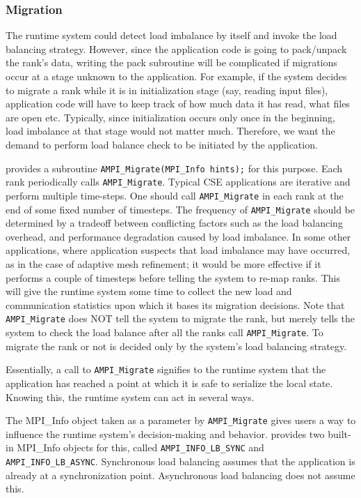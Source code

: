 \documentclass[10pt]{article}
\begin{document}
\subsubsection{Migration}

The \ampi{} runtime system could detect load imbalance by itself and invoke the
load balancing strategy. However, since the application code is going to
pack/unpack the rank's data, writing the pack subroutine will be complicated
if migrations occur at a stage unknown to the application. For example, if the
system decides to migrate a rank while it is in initialization stage (say,
reading input files), application code will have to keep track of how much data
it has read, what files are open etc. Typically, since initialization occurs
only once in the beginning, load imbalance at that stage would not matter much.
Therefore, we want the demand to perform load balance check to be initiated by
the application.

\ampi{} provides a subroutine \texttt{AMPI\_Migrate(MPI\_Info hints);} for
this purpose. Each rank periodically calls \texttt{AMPI\_Migrate}. Typical
CSE applications are iterative and perform multiple time-steps. One should call
\texttt{AMPI\_Migrate} in each rank at the end of some fixed number of
timesteps. The frequency of \texttt{AMPI\_Migrate} should be determined by a
tradeoff between conflicting factors such as the load balancing overhead, and
performance degradation caused by load imbalance. In some other applications,
where application suspects that load imbalance may have occurred, as in the
case of adaptive mesh refinement; it would be more effective if it performs a
couple of timesteps before telling the system to re-map ranks. This will give
the \ampi{} runtime system some time to collect the new load and communication
statistics upon which it bases its migration decisions. Note that
\texttt{AMPI\_Migrate} does NOT tell the system to migrate the rank, but
merely tells the system to check the load balance after all the ranks call
\texttt{AMPI\_Migrate}. To migrate the rank or not is decided only by the
system's load balancing strategy.

Essentially, a call to \texttt{AMPI\_Migrate} signifies to the runtime system
that the application has reached a point at which it is safe to serialize
the local state. Knowing this, the runtime system can act in several ways.

The MPI\_Info object taken as a parameter by \texttt{AMPI\_Migrate} gives
users a way to influence the runtime system's decision-making and behavior.
\ampi{} provides two built-in MPI\_Info objects for this, called \texttt{AMPI\_INFO\_LB\_SYNC}
and \texttt{AMPI\_INFO\_LB\_ASYNC}. Synchronous load balancing assumes that
the application is already at a synchronization point. Asynchronous load balancing
does not assume this.
\end{document}
